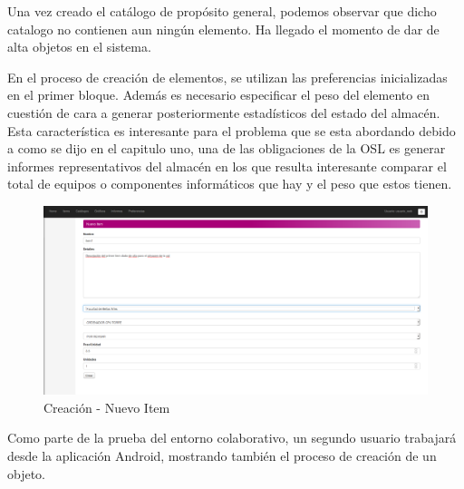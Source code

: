 \documentclass[a4paper,11pt]{book}
\begin{document}
Una vez creado el catálogo de propósito general, podemos observar que dicho catalogo no contienen aun ningún elemento. Ha llegado el momento de dar de alta objetos en el sistema. 

En el proceso de creación de elementos, se utilizan las preferencias inicializadas en el primer bloque. Además es necesario especificar el peso del elemento en cuestión de cara a generar posteriormente estadísticos del estado del almacén. Esta característica es interesante para el problema que se esta abordando debido a como se dijo en el capitulo uno, una de las obligaciones de la OSL es generar informes representativos del almacén en los que resulta interesante comparar el total de equipos o componentes informáticos que hay y el peso que estos tienen. 
\begin{figure}[H] 
\centering 
\includegraphics[scale=0.2]{imagenes/pruebas/nuevo_item.png}
\caption{ Creación - Nuevo Item\cite{propio}}
\end{figure}

Como parte de la prueba del entorno colaborativo, un segundo usuario trabajará desde la aplicación Android, mostrando también el proceso de creación de un objeto. 
\end{document}
